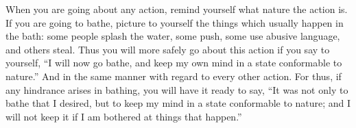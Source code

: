 When you are going about any action, remind yourself what nature
the action is. If you are going to bathe, picture to yourself the
things which usually happen in the bath: some people splash the water,
some push, some use abusive language, and others steal. Thus you will
more safely go about this action if you say to yourself, ``I will now
go bathe, and keep my own mind in a state conformable to nature.''
And in the same manner with regard to every other action. For thus,
if any hindrance arises in bathing, you will have it ready to say,
``It was not only to bathe that I desired, but to keep my mind in a
state conformable to nature; and I will not keep it if I am bothered
at things that happen.''

